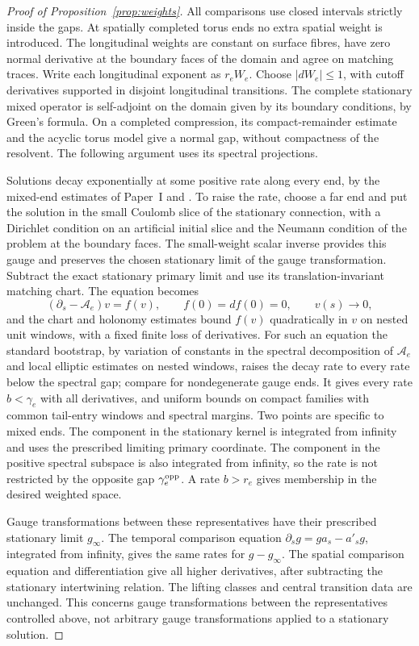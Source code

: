 \documentclass[11pt]{amsart}
\theoremstyle{definition}
\theoremstyle{remark}
\theoremstyle{plain}
\numberwithin{equation}{section}
\begin{document}
\begin{proof}[Proof of Proposition~\ref{prop:weights}]
All comparisons use closed intervals strictly inside the gaps.
At spatially completed torus ends no extra spatial weight is
introduced. The longitudinal weights are constant on surface
fibres, have zero normal derivative at the boundary faces of the
domain and agree on matching traces. Write each longitudinal exponent
as $r_eW_e$. Choose $|dW_e|\leq1$, with cutoff derivatives supported
in disjoint longitudinal transitions. The complete stationary
mixed operator is self-adjoint on the domain given by its boundary
conditions, by Green's formula. On a completed compression, its
compact-remainder estimate and the acyclic torus model give a normal
gap, without compactness of the resolvent. The following argument
uses its spectral projections.

Solutions decay exponentially at some positive rate along every end,
by the mixed-end estimates of Paper~I and \cite[Section~5.3]{DFL}.
To raise the rate, choose a far end and put the solution in the small
Coulomb slice of the stationary connection, with a Dirichlet condition
on an artificial initial slice and the Neumann condition of the
problem at the boundary faces. The small-weight scalar inverse
provides this gauge and preserves the chosen stationary limit of the
gauge transformation. Subtract the exact stationary primary limit and
use its translation-invariant matching chart. The equation becomes
\[
 (\partial_s-\mathcal A_e)v=f(v),\qquad f(0)=df(0)=0,
 \qquad v(s)\longrightarrow0,
\]
and the chart and holonomy estimates bound $f(v)$ quadratically in
$v$ on nested unit windows, with a fixed finite loss of derivatives.
For such an equation the standard bootstrap, by variation of constants
in the spectral decomposition of $\mathcal A_e$ and local elliptic
estimates on nested windows, raises the decay rate to every rate below
the spectral gap; compare \cite[Section~4.1]{Donaldson-book} for
nondegenerate gauge ends. It gives every rate $b<\gamma_e$ with all
derivatives, and uniform bounds on compact families with common
tail-entry windows and spectral margins. Two points are specific to
mixed ends. The component in the stationary kernel is integrated from
infinity and uses the prescribed limiting primary coordinate. The
component in the positive spectral subspace is also integrated from
infinity, so the rate is not restricted by the opposite gap
$\gamma_e^{\rm opp}$. A rate $b>r_e$ gives membership in the desired
weighted space.

Gauge transformations between these representatives have their
prescribed stationary limit $g_\infty$. The temporal comparison
equation $\partial_s g=g a_s-a'_s g$, integrated from infinity, gives
the same rates for $g-g_\infty$. The spatial comparison equation
and differentiation give all higher derivatives, after subtracting
the stationary intertwining relation. The lifting classes and
central transition data are unchanged. This concerns gauge
transformations between the representatives controlled above, not
arbitrary gauge transformations applied to a stationary solution.


\end{proof}
\end{document}
